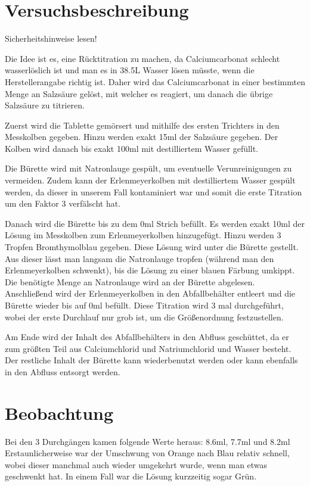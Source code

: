 \documentclass[8pt, letterpaper]{article}
\begin{document}
\section{Versuchsbeschreibung}
Sicherheitshinweise lesen!

Die Idee ist es, eine Rücktitration zu machen, da Calciumcarbonat schlecht wasserlöslich ist und man es in 38.5L Wasser lösen müsste, wenn die Herstellerangabe richtig ist.
Daher wird das Calciumcarbonat in einer bestimmten Menge an Salzsäure gelöst, mit welcher es reagiert, um danach die übrige Salzsäure zu titrieren.

Zuerst wird die Tablette gemörsert und mithilfe des ersten Trichters in den Messkolben gegeben. Hinzu werden exakt 15ml der Salzsäure gegeben. Der Kolben wird danach bis exakt 100ml mit destilliertem Wasser gefüllt.

Die Bürette wird mit Natronlauge gespült, um eventuelle Verunreinigungen zu vermeiden. Zudem kann der Erlenmeyerkolben mit destilliertem Wasser gespült werden, da dieser in unserem Fall kontaminiert war und somit die erste Titration um den Faktor 3 verfälscht hat.

Danach wird die Bürette bis zu dem 0ml Strich befüllt. Es werden exakt 10ml der Lösung im Messkolben zum Erlenmeyerkolben hinzugefügt. Hinzu werden 3 Tropfen Bromthymolblau gegeben.
Diese Lösung wird unter die Bürette gestellt. Aus dieser lässt man langsam die Natronlauge tropfen (während man den Erlenmeyerkolben schwenkt), bis die Lösung zu einer blauen Färbung umkippt.
Die benötigte Menge an Natronlauge wird an der Bürette abgelesen. Anschließend wird der Erlenmeyerkolben in den Abfallbehälter entleert und die Bürette wieder bis auf 0ml befüllt.
Diese Titration wird 3 mal durchgeführt, wobei der erste Durchlauf nur grob ist, um die Größenordnung festzustellen.

Am Ende wird der Inhalt des Abfallbehälters in den Abfluss geschüttet, da er zum größten Teil aus Calciumchlorid und Natriumchlorid und Wasser besteht.
Der restliche Inhalt der Bürette kann wiederbenutzt werden oder kann ebenfalls in den Abfluss entsorgt werden.

\section{Beobachtung}
Bei den 3 Durchgängen kamen folgende Werte heraus: 8.6ml, 7.7ml und 8.2ml \\
Erstaunlicherweise war der Umschwung von Orange nach Blau relativ schnell, wobei dieser manchmal auch wieder umgekehrt wurde, wenn man etwas geschwenkt hat. In einem Fall war die Lösung kurzzeitig sogar Grün.
\end{document}
